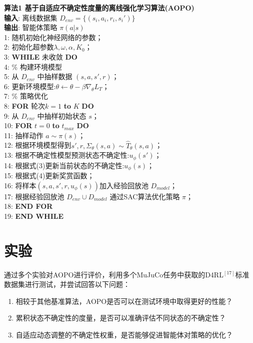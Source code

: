 \documentclass{article}
\begin{document}
\noindent \textbf{算法1 基于自适应不确定性度量的离线强化学习算法(AOPO)} \\
\textbf{输入}: 离线数据集 $D_{env} = \{(s_{i}, a_{i}, r_{i}, s_{i}')\}$ \\
\textbf{输出}: 智能体策略 $\pi(a | s)$ \\
1: 随机初始化神经网络的参数；\\
2: 初始化超参数$\lambda,\omega,\alpha,K_0$；\\
3: \textbf{WHILE} 未收敛 \textbf{DO} \\
4: \quad \% 构建环境模型 \\
5: \quad 从 $D_{env}$ 中抽样数据 $(s, a, s', r)$；\\
6: \quad 更新环境模型:$\theta \leftarrow \theta - \beta \nabla_{\theta}L_T$；\\
7: \quad \% 策略优化 \\
8: \quad \textbf{FOR} 轮次$k= 1$ \textbf{to} $K$ \textbf{DO} \\
9: \quad \quad 从 $D_{env}$ 中抽样初始状态 $s$；\\
10: \quad \quad \textbf{FOR} $t=0$ \textbf{to} $t_{max}$ \textbf{DO} \\
11: \quad \quad \quad 抽样动作 $a \sim \pi(s)$；\\
12: \quad \quad \quad 根据环境模型得到$s',r,\Sigma_{\theta}(s, a) \sim \hat{T}_{\theta}(s, a)$；\\
13: \quad \quad \quad 根据不确定性模型预测状态不确定性:$u_{\phi}(s')$；\\
14: \quad \quad \quad 根据式(3)更新当前状态的不确定性:$u_{\phi}(s)$；\\
15: \quad \quad \quad 根据式(4)更新奖赏函数；\\
16: \quad \quad \quad 将样本$(s,a,s',r,u_{\phi}(s))$加入经验回放池 $D_{model}$；\\
17: \quad \quad 根据经验回放池 $D_{env} \cup D_{model}$ 通过SAC算法优化策略 $\pi$；\\
18: \quad \textbf{END FOR} \\
19: \textbf{END WHILE}

\section{实验}
通过多个实验对AOPO进行评价，利用多个MuJuCo任务中获取的D4RL$^{[17]}$标准数据集进行测试，并尝试回答以下问题：
\begin{enumerate}
  \item 相较于其他基准算法，AOPO是否可以在测试环境中取得更好的性能？
  \item 累积状态不确定性的度量，是否可以准确评估不同状态的不确定性？
  \item 自适应动态调整的不确定性权重，是否能够促进智能体对策略的优化？
\end{enumerate}
\end{document}
